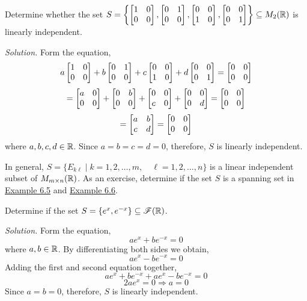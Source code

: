 \begin{example}\label{example:6.6}
Determine whether the set $S = \left\{\begin{bmatrix} 1 & 0 \\ 0 & 0 \end{bmatrix}, \begin{bmatrix} 0 & 1 \\ 0 & 0 \end{bmatrix}, \begin{bmatrix} 0 & 0 \\ 1 & 0 \end{bmatrix}, \begin{bmatrix} 0 & 0 \\ 0 & 1 \end{bmatrix}\right\} \subseteq M_2(\mathbb{R})$ is linearly independent.

\textit{Solution.} Form the equation,
$$a\begin{bmatrix} 1 & 0 \\ 0 & 0 \end{bmatrix} + b\begin{bmatrix} 0 & 1 \\ 0 & 0 \end{bmatrix} + c\begin{bmatrix} 0 & 0 \\ 1 & 0 \end{bmatrix} + d\begin{bmatrix} 0 & 0 \\ 0 & 1 \end{bmatrix} = \begin{bmatrix} 0 & 0 \\ 0 & 0 \end{bmatrix}$$
$$=\begin{bmatrix} a & 0 \\ 0 & 0 \end{bmatrix} + \begin{bmatrix} 0 & b \\ 0 & 0 \end{bmatrix} + \begin{bmatrix} 0 & 0 \\ c & 0 \end{bmatrix} + \begin{bmatrix} 0 & 0 \\ 0 & d \end{bmatrix} = \begin{bmatrix} 0 & 0 \\ 0 & 0 \end{bmatrix}$$
$$=\begin{bmatrix} a & b \\ c & d \end{bmatrix} = \begin{bmatrix} 0 & 0 \\ 0 & 0 \end{bmatrix}$$
where $a, b, c, d \in \mathbb{R}$. Since $a = b = c = d = 0$, therefore, $S$ is linearly independent.
\end{example}

\lline

In general, $S = \{E_{k\ell} \mid k = 1, 2, \dots, m, \quad \ell = 1, 2, \dots, n\}$ is a linear independent subset of $M_{m \times n}(\mathbb{R})$. As an exercise, determine if the set $S$ is a spanning set in \hyperref[example:6.5]{Example 6.5} and \hyperref[example:6.6]{Example 6.6}.

\begin{example}
Determine if the set $S = \{e^x, e^{-x}\} \subseteq \mathscr{F}(\mathbb{R})$.

\textit{Solution.} Form the equation,
$$ae^x + be^{-x} = 0$$
where $a, b \in \mathbb{R}$. By differentiating both sides we obtain,
$$ae^x -be^{-x} = 0$$
Adding the first and second equation together,
$$ae^x + be^{-x} + ae^x - be^{-x} = 0$$
$$2ae^x = 0 \Longrightarrow a = 0$$
Since $a = b = 0$, therefore, $S$ is linearly independent.
\end{example}

